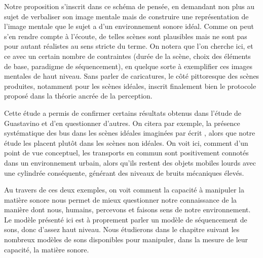   Notre proposition s'inscrit dans ce schéma de pensée, en demandant non plus au sujet de verbaliser son image mentale mais de \og construire \fg une représentation de l'image mentale que le sujet a d'un environnement sonore idéal. Comme on peut s'en rendre compte à l'écoute, de telles scènes sont plausibles mais ne sont pas pour autant réalistes au sens stricte du terme. On notera que l'on cherche ici, et ce avec un certain nombre de contraintes (durée de la scène, choix des éléments de base, paradigme de séquencement), en quelque sorte à exemplifier ces images mentales de haut niveau. Sans parler de caricatures, le côté pittoresque des scènes produites, notamment pour les scènes idéales, inscrit finalement bien le protocole proposé dans la théorie ancrée de la perception.

  Cette étude a permis de confirmer certains résultats obtenus dans l'étude de Guastavino\cite{guastavino2006ideal} et d'en questionner d'autres. On citera par exemple, la présence systématique des bus dans les scènes idéales imaginées \og par écrit \fg, alors que notre étude les placent plutôt dans les scènes non idéales. On voit ici, comment d'un point de vue conceptuel, les transports en commun sont positivement connotés dans un environnement urbain, alors qu'ils restent des objets mobiles lourds avec une cylindrée conséquente, générant des niveaux de bruits mécaniques élevés\cite{lafayhal-01300399}.

  Au travers de ces deux exemples, on voit comment la capacité à manipuler la matière sonore nous permet de mieux questionner notre connaissance de la manière dont nous, humains, percevons et faisons sens de notre environnement. Le modèle présenté ici est à proprement parler un modèle de séquencement de sons, donc d'assez haut niveau. Nous étudierons dans le chapitre suivant les nombreux modèles de sons disponibles pour manipuler, dans la mesure de leur capacité, la matière sonore. %


